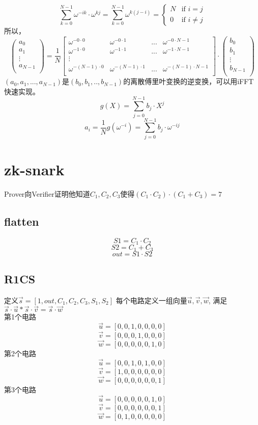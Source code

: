 \documentclass{article}
\begin{document}
$$
\sum_{k=0}^{N-1}{\omega^{-ik}\cdot \omega^{kj}}=\sum_{k=0}^{N-1}{\omega^{k(j-i)}}
=
\begin{cases}
N &\text{if } i = j \\
0 &\text{if } i \not = j
\end{cases}
$$
所以，
$$
\begin{pmatrix} a_0 \\ a_1 \\ \vdots \\a_{N-1}\\ \end{pmatrix} 
= \frac{1}{N}
\begin{bmatrix}
\omega^{-0\cdot0} & \omega^{-0\cdot1} & ... & \omega^{-0\cdot{N-1}}\\
\omega^{-1\cdot0} & \omega^{-1\cdot1} & ... & \omega^{-1\cdot{N-1}}\\
\vdots & \\
\omega^{-(N-1)\cdot0} & \omega^{-(N-1)\cdot1} & ... & \omega^{-(N-1)\cdot{N-1}}\\
\end{bmatrix}
\cdot
\begin{pmatrix} b_0 \\ b_1 \\ \vdots \\b_{N-1}\\ \end{pmatrix}
$$
$(a_0,a_1,...,a_{N-1})$是$(b_0,b_1,..,b_{N-1})$的离散傅里叶变换的逆变换，可以用iFFT快速实现。
$$g(X) = \sum_{j=0}^{N-1}{b_j\cdot X^j}$$
$$a_i= \frac{1}{N}g(\omega^{-i})=\sum_{j=0}^{N-1}{b_j\cdot \omega^{-ij}}$$

\section{zk-snark}
Prover向Verifier证明他知道$C_1,C_2,C_3$使得$(C_1\cdot C_2)\cdot(C_1+C_3)=7$
\subsection{flatten}
$$S1 = C_1 \cdot C_2$$
$$S2 = C_1 + C_3$$
$$out = S1 \cdot S2$$

\subsection{R1CS}
定义$\overrightarrow{s}=[1,out,C_1,C_2,C_3,S_1,S_2]$
每个电路定义一组向量$\overrightarrow{u},\overrightarrow{v},\overrightarrow{w}$,
满足$\overrightarrow{s}\cdot\overrightarrow{u} * \overrightarrow{s}\cdot\overrightarrow{v} = \overrightarrow{s}\cdot\overrightarrow{w}$\\
第1个电路
$$\overrightarrow{u} = [0,0,1,0,0,0,0]$$
$$\overrightarrow{v} = [0,0,0,1,0,0,0]$$
$$\overrightarrow{w} = [0,0,0,0,0,1,0]$$
第2个电路
$$\overrightarrow{u} = [0,0,1,0,1,0,0]$$
$$\overrightarrow{v} = [1,0,0,0,0,0,0]$$
$$\overrightarrow{w} = [0,0,0,0,0,0,1]$$
第3个电路
$$\overrightarrow{u} = [0,0,0,0,0,1,0]$$
$$\overrightarrow{v} = [0,0,0,0,0,0,1]$$
$$\overrightarrow{w} = [0,1,0,0,0,0,0]$$
\end{document}
